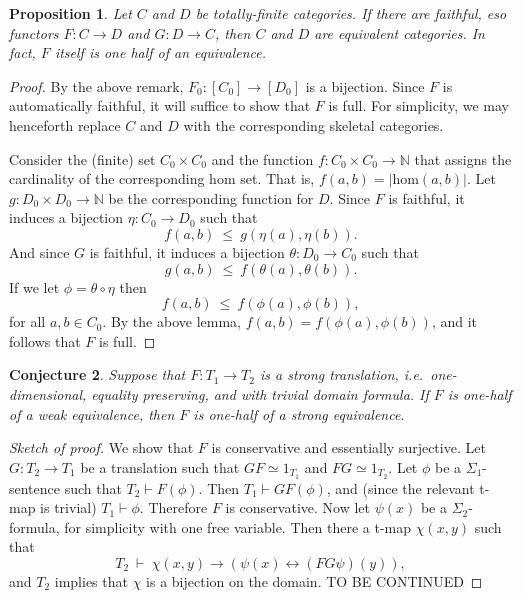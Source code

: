 \documentclass[12pt]{article}
\newtheorem{prop}{Proposition}
\newtheorem{conj}[prop]{Conjecture}
\theoremstyle{definition}
\theoremstyle{remark}
\newcommand{\3}{\mathcal}
\begin{document}
\begin{prop} Let $C$ and $D$ be totally-finite categories. If there
  are faithful, eso functors $F:C\to D$ and $G:D\to C$, then $C$ and
  $D$ are equivalent categories. In fact, $F$ itself is one half of an
  equivalence. \end{prop}

\begin{proof} By the above remark, $F_0:[C_0]\to [D_0]$ is a
  bijection. Since $F$ is automatically faithful, it will suffice to
  show that $F$ is full. For simplicity, we may henceforth replace $C$
  and $D$ with the corresponding skeletal categories.

  Consider the (finite) set $C_0\times C_0$ and the function
  $f:C_0\times C_0\to \mathbb{N}$ that assigns the cardinality of the
  corresponding hom set. That is, $f(a,b)=|\mathrm{hom}(a,b)|$. Let
  $g:D_0\times D_0\to\mathbb{N}$ be the corresponding function for
  $D$. Since $F$ is faithful, it induces a bijection
  $\eta :C_0\to D_0$ such that
  \[ f(a,b) \: \leq \: g(\eta (a),\eta (b)) .\] And since $G$ is
  faithful, it induces a bijection $\theta :D_0\to C_0$ such that
  \[ g(a,b) \: \leq \: f(\theta (a),\theta (b)) .\] If we let
  $\phi = \theta \circ\eta$ then
  \[ f(a,b) \: \leq \: f(\phi (a),\phi (b)) ,\] for all $a,b\in
  C_0$. By the above lemma, $f(a,b)=f(\phi (a),\phi (b))$, and it
  follows that $F$ is full. \end{proof}

\begin{conj} Suppose that $F:T_1\to T_2$ is a strong translation,
  i.e.\ one-dimensional, equality preserving, and with trivial domain
  formula. If $F$ is one-half of a weak equivalence, then $F$ is
  one-half of a strong equivalence. \end{conj}

\begin{proof}[Sketch of proof] We show that $F$ is conservative and
  essentially surjective. Let $G:T_2\to T_1$ be a translation such
  that $GF\simeq 1_{T_1}$ and $FG\simeq 1_{T_2}$. Let $\phi$ be a
  $\Sigma _1$-sentence such that $T_2\vdash F(\phi )$. Then
  $T_1\vdash GF(\phi )$, and (since the relevant t-map is trivial)
  $T_1\vdash \phi$. Therefore $F$ is conservative. Now let $\psi (x)$
  be a $\Sigma _2$-formula, for simplicity with one free
  variable. Then there a t-map $\chi (x,y)$ such that
  \[ T_2\: \vdash \: \chi (x,y)\to (\psi (x)\leftrightarrow (FG\psi
    )(y)) ,
  \] and $T_2$ implies that $\chi$ is a bijection on the domain. TO BE CONTINUED
 
\end{proof}
\end{document}
